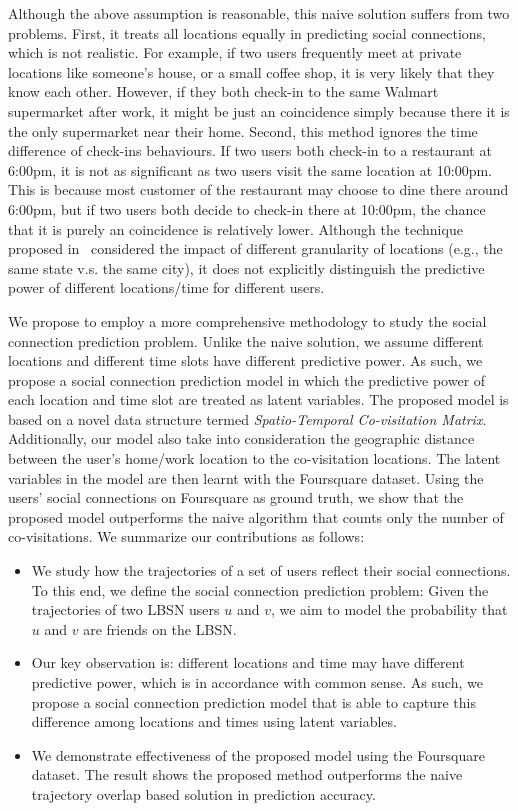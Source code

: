 Although the above assumption is reasonable, this naive solution suffers from two problems. First, it treats all locations equally in predicting social connections, which is not realistic. For example, if two users frequently meet at private locations like someone's house, or a small coffee shop, it is very likely that they know each other. However, if they both check-in to the same Walmart supermarket after work, it might be just an coincidence simply because there it is the only supermarket near their home. Second, this method ignores the time difference of check-ins behaviours. If two users both check-in to a restaurant at 6:00pm, it is not as significant as two users visit the same location at 10:00pm. This is because most customer of the restaurant may choose to dine there around 6:00pm, but if two users both decide to check-in there at 10:00pm, the chance that it is purely an coincidence is relatively lower. Although the technique proposed in~\cite{xiao2010finding} considered the impact of different granularity of locations (e.g., the same state v.s. the same city), it does not explicitly distinguish the predictive power of different locations/time for different users.

We propose to employ a more comprehensive methodology to study the social connection prediction problem. Unlike the naive solution, we assume different locations and different time slots have different predictive power. As such, we propose a social connection prediction model in which the predictive power of each location and time slot are treated as latent variables. The proposed model is based on a novel data structure termed \textit{Spatio-Temporal Co-visitation Matrix}. Additionally, our model also take into consideration the geographic distance between the user's home/work location to the co-visitation locations. The latent variables in the model are then learnt with the Foursquare dataset. Using the users' social connections on Foursquare as ground truth, we show that the proposed model outperforms the naive algorithm that counts only the number of co-visitations. We summarize our contributions as follows:
\begin{itemize}

\item We study how the trajectories of a set of users reflect their social connections. To this end, we define the social connection prediction problem: Given the trajectories of two LBSN users $u$ and $v$, we aim to model the probability that $u$ and $v$ are friends on the LBSN.

\item Our key observation is: different locations and time may have different predictive power, which is in accordance with common sense. As such, we propose a social connection prediction model that is able to capture this difference among locations and times using latent variables.

\item We demonstrate effectiveness of the proposed model using the Foursquare dataset. The result shows the proposed method outperforms the naive trajectory overlap based solution in prediction accuracy.

\end{itemize} 


